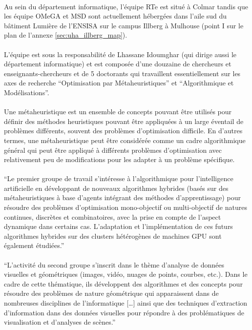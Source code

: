\documentclass[a4paper,11pt,twoside,french,report]{../common/simplem}
\begin{document}
				\paragraph*{}
					Au sein du département informatique, l'équipe \gls{RTe} est situé à Colmar tandis que les équipe \gls{OMeGA} et \gls{MSD} sont actuellement hébergées dans l'aile sud du bâtiment Lumière de l'\gls{ENSISA} sur le campus Illberg à Mulhouse (point I sur le plan de l'annexe \ref{sec:uha_illberg_map}).
				\paragraph*{}
					L'équipe est sous la responsabilité de Lhassane Idoumghar (qui dirige aussi le département informatique) et est composée d'une douzaine de chercheurs et enseignants-chercheurs et de 5 doctorants qui travaillent essentiellement sur les axes de recherche ``Optimisation par Métaheuristiques'' et ``Algorithmique et Modélisations''.
				\paragraph*{}
					Une métaheuristique est un ensemble de concepts pouvant être utilisés pour définir des méthodes heuristiques pouvant être appliquées à un large éventail de problèmes différents, souvent des problèmes d'optimisation difficile. En d'autres termes, une métaheuristique peut être considérée comme un cadre algorithmique général qui peut être appliqué à différents problèmes d'optimisation avec relativement peu de modifications pour les adapter à un problème spécifique.
				\paragraph*{}
					``Le premier groupe de travail s'intéresse à l'algorithmique pour l'intelligence artificielle en développant de nouveaux algorithmes hybrides (basés sur des métaheuristiques à base d'agents intégrant des méthodes d'apprentissage) pour résoudre des problèmes d'optimisation mono-objectif ou multi-objectif de natures continues, discrètes et combinatoires, avec la prise en compte de l'aspect dynamique dans certains cas. L'adaptation et l'implémentation de ces futurs algorithmes hybrides sur des clusters hétérogènes de machines GPU sont également étudiées.''~\cite{IRIMAS_OMeGA}
				\paragraph*{}
					``L'activité du second groupe s'inscrit dans le thème d'analyse de données visuelles et géométriques (images, vidéo, nuages de points, courbes, etc.). Dans le cadre de cette thématique, ils développent des algorithmes et des concepts pour résoudre des problèmes de nature géométrique qui apparaissent dans de nombreuses disciplines de l'informatique [\ldots] ainsi que des techniques d'extraction d'information dans des données visuelles pour répondre à des problématiques de visualisation et d'analyses de scènes.''~\cite{IRIMAS_OMeGA}
\end{document}
